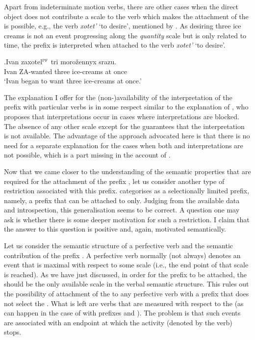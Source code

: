 Apart from indeterminate motion verbs, there are other cases when the direct object does not contribute a scale to the verb which makes the attachment of the   is possible, e.g., the verb \textit{xotet'} `to desire', mentioned by \citet{Braginsky:08}. As desiring three ice creams is not an event progressing along the \textit{quantity} scale but is only related to time, the prefix  is interpreted  when attached to the verb \textit{xotet'} `to desire'.

\exg.\label{ex:zaxotet}Ivan zaxotel$^{\textsc{pf}}$ tri moro\v{z}ennyx srazu.\\
Ivan ZA-wanted three ice-creams {at once}\\
\trans `Ivan began to want three ice-creams at once.'
\\

The explanation I offer for the (non-)availability of the  interpretation of the prefix  with particular verbs is in some respect similar to the explanation of \citet{Braginsky:08}, who proposes that  interpretations occur in cases where  interpretations are blocked. The absence of any other scale except for the  guarantees that the  interpretation is not available. The advantage of the approach advocated here is that there is no need for a separate explanation for the cases when both  and  interpretations are not possible, which is a part missing in the account of \citet{Braginsky:08}.

Now that we came closer to the understanding of the semantic properties that are required for the attachment of the  prefix , let us consider another type of restriction associated with this prefix. \citet{Tatevosov:09} categorises  as a selectionally limited prefix, namely, a prefix that can be attached to  only. Judging from the available data and introspection, this generalisation seems to be correct. A question one may ask is whether there is some deeper motivation for such a restriction. I claim that the answer to this question is positive and, again, motivated semantically. 

Let us consider the semantic structure of a perfective verb and the semantic contribution of the  prefix . A perfective verb normally (not always) denotes an event that is maximal with respect to some scale (i.e., the end point of that scale is reached). As we have just discussed, in order for the  prefix  to be attached, the  should be the only available scale in the verbal semantic structure. This rules out the possibility of attachment of the   to any perfective verb with a prefix that does not select the . What is left are verbs that are measured with respect to the  (as can happen in the case of  with prefixes  and ). The problem is that such events are associated with an endpoint at which the activity (denoted by the  verb) stops. 

